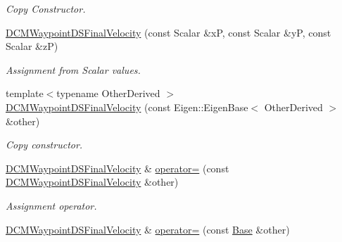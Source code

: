 \begin{DoxyCompactItemize}
\begin{DoxyCompactList}\small\item\em Copy Constructor. \end{DoxyCompactList}\item 
\hyperlink{classow__core_1_1DCMWaypointDSFinalVelocity_aee37c83e6c4deead30040b357b435dce}{D\+C\+M\+Waypoint\+D\+S\+Final\+Velocity} (const Scalar \&xP, const Scalar \&yP, const Scalar \&zP)\hypertarget{classow__core_1_1DCMWaypointDSFinalVelocity_aee37c83e6c4deead30040b357b435dce}{}\label{classow__core_1_1DCMWaypointDSFinalVelocity_aee37c83e6c4deead30040b357b435dce}

\begin{DoxyCompactList}\small\item\em Assignment from Scalar values. \end{DoxyCompactList}\item 
{\footnotesize template$<$typename Other\+Derived $>$ }\\\hyperlink{classow__core_1_1DCMWaypointDSFinalVelocity_a02086ad3ab3023b68606835d08942e66}{D\+C\+M\+Waypoint\+D\+S\+Final\+Velocity} (const Eigen\+::\+Eigen\+Base$<$ Other\+Derived $>$ \&other)
\begin{DoxyCompactList}\small\item\em Copy constructor. \end{DoxyCompactList}\item 
\hyperlink{classow__core_1_1DCMWaypointDSFinalVelocity}{D\+C\+M\+Waypoint\+D\+S\+Final\+Velocity} \& \hyperlink{classow__core_1_1DCMWaypointDSFinalVelocity_af6d0c97a8877ca9ee5d697d0d035bd0e}{operator=} (const \hyperlink{classow__core_1_1DCMWaypointDSFinalVelocity}{D\+C\+M\+Waypoint\+D\+S\+Final\+Velocity} \&other)\hypertarget{classow__core_1_1DCMWaypointDSFinalVelocity_af6d0c97a8877ca9ee5d697d0d035bd0e}{}\label{classow__core_1_1DCMWaypointDSFinalVelocity_af6d0c97a8877ca9ee5d697d0d035bd0e}

\begin{DoxyCompactList}\small\item\em Assignment operator. \end{DoxyCompactList}\item 
\hyperlink{classow__core_1_1DCMWaypointDSFinalVelocity}{D\+C\+M\+Waypoint\+D\+S\+Final\+Velocity} \& \hyperlink{classow__core_1_1DCMWaypointDSFinalVelocity_a597e11131a5f453cce341e7a38c755c7}{operator=} (const \hyperlink{classow__core_1_1LinearVelocity}{Base} \&other)\hypertarget{classow__core_1_1DCMWaypointDSFinalVelocity_a597e11131a5f453cce341e7a38c755c7}{}\label{classow__core_1_1DCMWaypointDSFinalVelocity_a597e11131a5f453cce341e7a38c755c7}


\end{DoxyCompactItemize}
